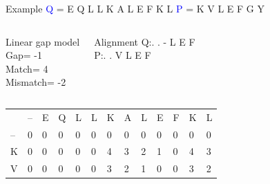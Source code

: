 \documentclass{bredelebeamer}
\begin{document}
 \begin{frame}{Example}
 \centering
 \textcolor{blue}{Q} = E Q L L K A L E F K L \quad \textcolor{blue}{P} = K V L E F G Y
\begin{columns}
\begin{block}{Linear gap model} \\
Gap= -1 \\
Match= 4 \\
Mismatch= -2
\end{block}
\begin{block}{Alignment}
Q:\quad . . - L E F \\
P:\quad . . V L E F
\end{block}
\end{columns}

\begin{table}[]
\centering
\begin{tabular}{*{13}{p{0.4cm}}}
                        & --                     & E                      & Q                      & L                      & L                      & K                      & \cellcolor[HTML]{FF0000}A                      & L                      &E                       & F                                               & K                       & L                       \\ \cline{2-13} 
\multicolumn{1}{l|}{--} & \multicolumn{1}{l|}{0} & \multicolumn{1}{l|}{0} & \multicolumn{1}{l|}{0} & \multicolumn{1}{l|}{0} & \multicolumn{1}{l|}{0} & \multicolumn{1}{l|}{0} & \multicolumn{1}{l|}{0} & \multicolumn{1}{l|}{0} & \multicolumn{1}{l|}{0}  & \multicolumn{1}{l|}{0}                          & \multicolumn{1}{l|}{0}  & \multicolumn{1}{l|}{0}  \\ \cline{2-13} 
\multicolumn{1}{l|}{K}  & \multicolumn{1}{l|}{0} & \multicolumn{1}{l|}{0} & \multicolumn{1}{l|}{0} & \multicolumn{1}{l|}{0} & \multicolumn{1}{l|}{0} & \multicolumn{1}{l|}{4} & \multicolumn{1}{l|}{3} & \multicolumn{1}{l|}{2} & \multicolumn{1}{l|}{1}  & \multicolumn{1}{l|}{0}                          & \multicolumn{1}{l|}{4}  & \multicolumn{1}{l|}{3}  \\ \cline{2-13}  %
\multicolumn{1}{l|}{\cellcolor[HTML]{FFFF00}V}  & \multicolumn{1}{l|}{0} & \multicolumn{1}{l|}{0} & \multicolumn{1}{l|}{0} & \multicolumn{1}{l|}{0} & \multicolumn{1}{l|}{0} & \multicolumn{1}{l|}{3} & \multicolumn{1}{l|}{\cellcolor[HTML]{00FF00}2} & \multicolumn{1}{l|}{1} & \multicolumn{1}{l|}{0}  & \multicolumn{1}{l|}{0}                          & \multicolumn{1}{l|}{3}  & \multicolumn{1}{l|}{2}  \\ \cline{2-13} 

\end{tabular}
\end{table}
\end{frame}
\end{document}
